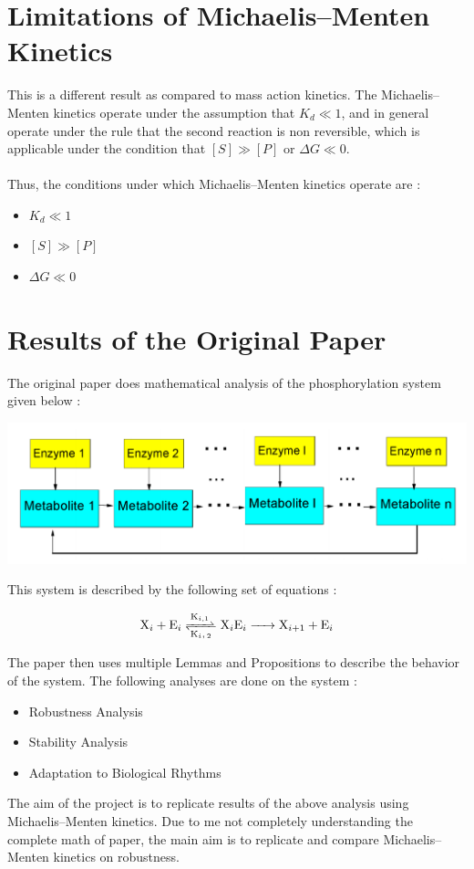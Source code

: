 \section*{Limitations of Michaelis–Menten Kinetics}

\noindent This is a different result as compared to mass 
action kinetics. The Michaelis–Menten kinetics operate under 
the assumption that $K_d \ll 1$, and in general operate under 
the rule that the second reaction is non reversible, which 
is applicable under the condition that $[S] \gg [P]$ or 
$\Delta G \ll 0$.
\\\\
Thus, the conditions under which Michaelis–Menten kinetics 
operate are :
\begin{itemize}
    \item $K_d \ll 1$
    \item $[S] \gg [P]$
    \item $\Delta G \ll 0$
\end{itemize}

\section*{Results of the Original Paper}
The original paper does mathematical analysis of the 
phosphorylation system given below :

\begin{center}
    \includegraphics[scale=0.3]{img/orig-sys.png}
\end{center}

\noindent This system is described by the following 
set of equations :

$$ \ce{X_i + E_i <=>[K_{i,1}][K_i,2] X_iE_i -> X_{i+1} + E_i}$$

\noindent The paper then uses multiple Lemmas and 
Propositions to describe the behavior of the system. The 
following analyses are done on the system :

\begin{itemize}
    \item Robustness Analysis
    \item Stability Analysis
    \item Adaptation to Biological Rhythms
\end{itemize}

\noindent The aim of the project is to replicate results of 
the above analysis using Michaelis–Menten kinetics. Due to 
me not completely understanding the complete math of paper, 
the main aim is to replicate and compare Michaelis–Menten 
kinetics on robustness.